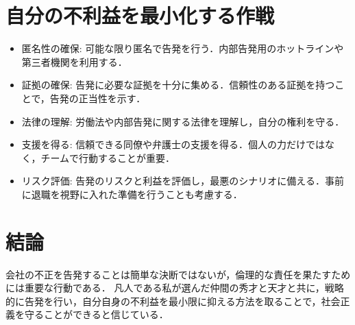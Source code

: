 \documentclass[titlepage,a4paper]{jsarticle}
\begin{document}
\section{自分の不利益を最小化する作戦}
\begin{itemize}
  \item 匿名性の確保: 可能な限り匿名で告発を行う．内部告発用のホットラインや第三者機関を利用する．
  \item 証拠の確保: 告発に必要な証拠を十分に集める．信頼性のある証拠を持つことで，告発の正当性を示す．
  \item 法律の理解: 労働法や内部告発に関する法律を理解し，自分の権利を守る．
  \item 支援を得る: 信頼できる同僚や弁護士の支援を得る．個人の力だけではなく，チームで行動することが重要．
  \item リスク評価: 告発のリスクと利益を評価し，最悪のシナリオに備える．事前に退職を視野に入れた準備を行うことも考慮する．
\end{itemize}
\section{結論}
会社の不正を告発することは簡単な決断ではないが，倫理的な責任を果たすためには重要な行動である．
凡人である私が選んだ仲間の秀才と天才と共に，戦略的に告発を行い，自分自身の不利益を最小限に抑える方法を取ることで，社会正義を守ることができると信じている．
\end{document}

